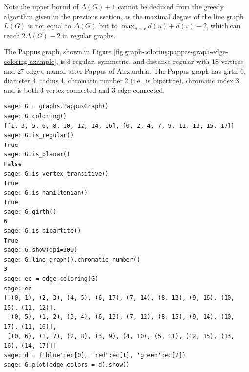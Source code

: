 Note the upper bound of $\Delta(G)+1$
cannot be deduced from the greedy algorithm given in the
previous section, as the maximal degree of the line graph
$L(G)$ is not equal to
$\Delta(G)$ but to $\displaystyle \max_{u\sim v}d(u)+d(v)-2$, which
can reach $2\Delta(G)-2$ in regular graphs.


\begin{example}
\label{eg:graph_coloring:pappas_graph_edge_coloring_example}
The Pappus graph, shown in Figure
\ref{fig:graph-coloring:pappas-graph-edge-coloring-example},
 is $3$-regular, symmetric, and distance-regular with 18 vertices and
27 edges, named after Pappus of Alexandria.
The Pappus graph has girth 6, diameter 4, radius 4, chromatic number
2 (i.e., is bipartite),
chromatic index 3 and is both 3-vertex-connected and 3-edge-connected.

\begin{lstlisting}
sage: G = graphs.PappusGraph()
sage: G.coloring()
[[1, 3, 5, 6, 8, 10, 12, 14, 16], [0, 2, 4, 7, 9, 11, 13, 15, 17]]
sage: G.is_regular()
True
sage: G.is_planar()
False
sage: G.is_vertex_transitive()
True
sage: G.is_hamiltonian()
True
sage: G.girth()
6
sage: G.is_bipartite()
True
sage: G.show(dpi=300)
sage: G.line_graph().chromatic_number()
3
sage: ec = edge_coloring(G)
sage: ec
[[(0, 1), (2, 3), (4, 5), (6, 17), (7, 14), (8, 13), (9, 16), (10, 15), (11, 12)],
 [(0, 5), (1, 2), (3, 4), (6, 13), (7, 12), (8, 15), (9, 14), (10, 17), (11, 16)],
 [(0, 6), (1, 7), (2, 8), (3, 9), (4, 10), (5, 11), (12, 15), (13, 16), (14, 17)]]
sage: d = {'blue':ec[0], 'red':ec[1], 'green':ec[2]}
sage: G.plot(edge_colors = d).show()
\end{lstlisting}


\end{example}

